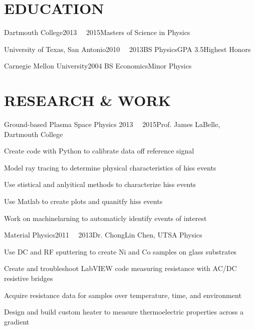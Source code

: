 \documentclass[12pt,a4paper]{resume}
\begin{document}

\makecvtitle

\section{EDUCATION}

\begin{school}{Dartmouth College}{2013 \textemdash \ \ 2015}{Masters of Science in Physics}{}{}{}
\end{school}

\begin{school}{University of Texas, San Antonio}{2010 \textemdash  \ \ 2013}{BS Physics}{GPA 3.5}{Highest Honors}{}
\end{school}

\begin{school}{Carnegie Mellon University}{2004 }{BS Economics}{}{Minor Physics}{}
\end{school}

\section{RESEARCH \& WORK}

\begin{work}{Ground-based Plasma Space Physics }{2013  \textemdash \ \ 2015}{Prof. James LaBelle, Dartmouth College }
\item{Create code with Python to calibrate data off reference signal}
\item{Model ray tracing to determine physical characteristics of hiss events}
\item{Use stistical and anlyitical methods to characterize hiss events}
\item{Use Matlab to create plots and quanitfy hiss events}
\item{Work on machinelarning to automaticly identify events of interest}
\end{work}

\begin{work}{Material Physics}{2011  \textemdash \ \ 2013}{Dr. ChongLin Chen, UTSA Physics}
\item{Use DC and RF sputtering to create Ni and Co samples on glass substrates}
\item{Create and troubleshoot LabVIEW code measuring resistance with AC/DC resistive bridges}
\item{\normalsize Acquire resistance data for samples over temperature, time, and environment}
\item{Design and build custom heater to measure thermoelectric properties across a gradient}
\end{work}
\end{document}
